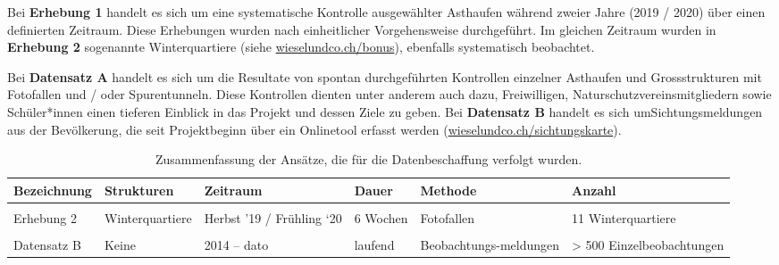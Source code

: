 \documentclass[
]{scrbook}
\begin{document}
Bei \textbf{Erhebung 1} handelt es sich um eine systematische Kontrolle ausgewählter Asthaufen während zweier Jahre (2019 / 2020) über einen definierten Zeitraum. Diese Erhebungen wurden nach einheitlicher Vorgehensweise durchgeführt. Im gleichen Zeitraum wurden in \textbf{Erhebung 2} sogenannte Winterquartiere (siehe \href{http://www.wieselundco.ch/bonus}{wieselundco.ch/bonus}), ebenfalls systematisch beobachtet.

Bei \textbf{Datensatz A} handelt es sich um die Resultate von spontan durchgeführten Kontrollen einzelner Asthaufen und Grossstrukturen mit Fotofallen und / oder Spurentunneln. Diese Kontrollen dienten unter anderem auch dazu, Freiwilligen, Naturschutzvereinsmitgliedern sowie Schüler*innen einen tieferen Einblick in das Projekt und dessen Ziele zu geben. Bei \textbf{Datensatz B} handelt es sich umSichtungsmeldungen aus der Bevölkerung, die seit Projektbeginn über ein Onlinetool erfasst werden (\href{http://www.wieselundco.ch/beobachtung}{wieselundco.ch/sichtungskarte}).

\begin{table}

\caption{\label{tab:erhebungswochen}Zusammenfassung der Ansätze, die für die Datenbeschaffung verfolgt wurden.}
\centering
\begin{tabular}[t]{llp{20mm}lp{22mm}p{40mm}}
\toprule
Bezeichnung & Strukturen & Zeitraum & Dauer & Methode & Anzahl\\
\midrule
\cellcolor{gray!6}{Erhebung 1} & \cellcolor{gray!6}{Asthaufen} & \cellcolor{gray!6}{Herbst ’19 / Frühling ‘20} & \cellcolor{gray!6}{6 Wochen} & \cellcolor{gray!6}{Spurentunnel} & \cellcolor{gray!6}{39 Asthaufen}\\
Erhebung 2 & Winterquartiere & Herbst ’19 / Frühling ‘20 & 6 Wochen & Fotofallen & 11 Winterquartiere\\
\cellcolor{gray!6}{Datensatz A} & \cellcolor{gray!6}{Asthaufen} & \cellcolor{gray!6}{2014 - 2019} & \cellcolor{gray!6}{Variabel} & \cellcolor{gray!6}{Spurentunnel / Fotofallen} & \cellcolor{gray!6}{32 Asthaufen}\\
Datensatz B & Keine & 2014 – dato & laufend & Beobachtungs-meldungen & > 500 Einzelbeobachtungen\\
\bottomrule
\end{tabular}
\end{table}
\end{document}
